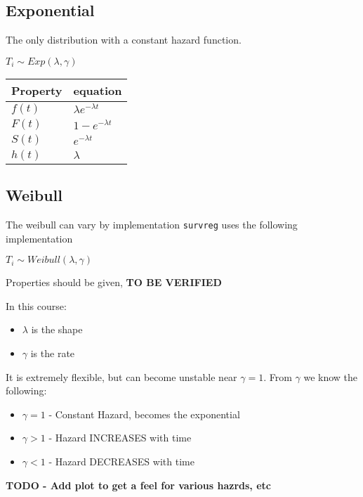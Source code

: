 \documentclass[
  letterpaper,
  DIV=11,
  numbers=noendperiod]{scrreprt}
\providecommand{\tightlist}{%
  \setlength{\itemsep}{0pt}\setlength{\parskip}{0pt}}\usepackage{longtable,booktabs,array}
\begin{document}
\hypertarget{exponential}{%
\subsection{Exponential}\label{exponential}}

The only distribution with a constant hazard function.

\(T_i \sim Exp(\lambda, \gamma)\)

\begin{longtable}[]{@{}ll@{}}
\toprule()
Property & equation \\
\midrule()
\endhead
\(f(t)\) & \(\lambda e^{-\lambda t}\) \\
\(F(t)\) & \(1 - e^{-\lambda t}\) \\
\(S(t)\) & \(e^{-\lambda t}\) \\
\(h(t)\) & \(\lambda\) \\
\bottomrule()
\end{longtable}

\hypertarget{weibull}{%
\subsection{Weibull}\label{weibull}}

The weibull can vary by implementation \texttt{survreg} uses the
following implementation

\(T_i \sim Weibull(\lambda, \gamma)\)

Properties should be given, \textbf{TO BE VERIFIED}

In this course:

\begin{itemize}
\tightlist
\item
  \(\lambda\) is the shape
\item
  \(\gamma\) is the rate
\end{itemize}

It is extremely flexible, but can become unstable near \(\gamma = 1\).
From \(\gamma\) we know the following:

\begin{itemize}
\tightlist
\item
  \(\gamma = 1\) - Constant Hazard, becomes the exponential
\item
  \(\gamma > 1\) - Hazard INCREASES with time
\item
  \(\gamma < 1\) - Hazard DECREASES with time
\end{itemize}

\textbf{TODO - Add plot to get a feel for various hazrds, etc}
\end{document}
